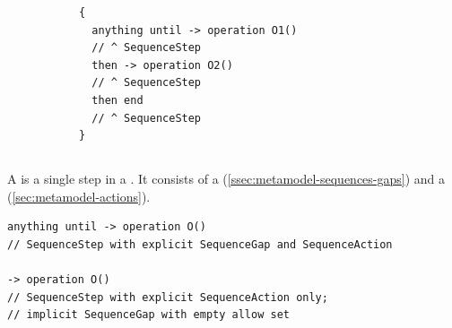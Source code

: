 \begin{figure}[h!]

  \begin{subfigure}[t]{\egtextwidth}
    \begin{lstlisting}[style=Example]
{
  anything until -> operation O1()
  // ^ SequenceStep
  then -> operation O2()
  // ^ SequenceStep
  then end
  // ^ SequenceStep
}
    \end{lstlisting}
  \end{subfigure}
  \hfill
  \begin{subfigure}[t]{\eggraphicalwidth}
    \gsecaption
    \centering
  \end{subfigure}

\end{figure}

\subsection{\msequencestep}\label{ssec:metamodel-sequences-steps}

A \msequencestep{} is a single step in a \msubsequence.  It consists of a
\msequencegap{} (\cref{ssec:metamodel-sequences-gaps}) and a
\msequenceaction{} (\cref{sec:metamodel-actions}).

\begin{lstlisting}[style=Example]
anything until -> operation O()
// SequenceStep with explicit SequenceGap and SequenceAction

-> operation O()
// SequenceStep with explicit SequenceAction only;
// implicit SequenceGap with empty allow set
\end{lstlisting}

